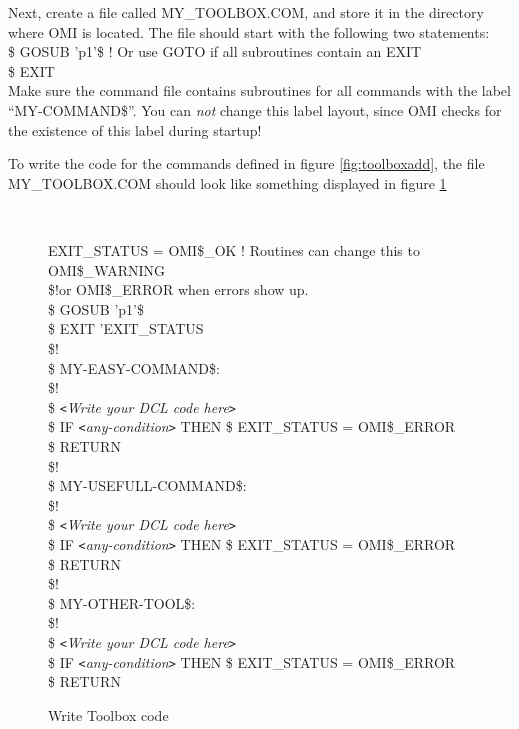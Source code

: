\documentclass[a4paper]{book}
\newcommand{\vs}{\vspace{3mm}}
\newcommand{\lt}{\texttt{<}}
\newcommand{\gt}{\texttt{>}}
\renewcommand{\indent}{\hspace*{5mm}}
\begin{document}
Next, create a file called MY{\_}TOOLBOX.COM, and store it in the directory 
where OMI is located. The file should start with the following two 
statements: \\
\indent\textsf{{\$} GOSUB 'p1'{\$} ! Or use GOTO if all subroutines contain an EXIT} \\
\indent\textsf{{\$} EXIT} \\
Make sure the command file contains subroutines for all commands with the 
label ``MY-COMMAND{\$}''. You can \textit{not} change this label layout, since OMI checks 
for the existence of this label during startup!

\vs

To write the code for the commands defined in figure \ref{fig:toolboxadd}, the file 
\linebreak MY{\_}TOOLBOX.COM should look like something displayed in figure \ref{fig:toolboxcre}

\begin{figure}[ht]
\begin{minipage}[t]{\textwidth}
\hrulefill \\
\begin{ttfamily}
\noindent{\$} EXIT{\_}STATUS = OMI{\$}{\_}OK ! Routines can change this to OMI{\$}{\_}WARNING \\
{\$}!\hspace{3cm}or OMI{\$}{\_}ERROR when errors show up. \\
{\$} GOSUB 'p1'{\$} \\
{\$} EXIT 'EXIT{\_}STATUS \\
{\$}! \\
{\$} MY-EASY-COMMAND{\$}: \\
{\$}! \\
{\$} \textit{\lt Write your DCL code here\gt} \\
{\$} IF \textit{\lt any-condition\gt} THEN {\$} EXIT{\_}STATUS = OMI{\$}{\_}ERROR \\
{\$} RETURN \\
{\$}! \\
{\$} MY-USEFULL-COMMAND{\$}: \\
{\$}! \\
{\$} \textit{\lt Write your DCL code here\gt} \\
{\$} IF \textit{\lt any-condition\gt} THEN {\$} EXIT{\_}STATUS = OMI{\$}{\_}ERROR \\
{\$} RETURN \\
{\$}! \\
{\$} MY-OTHER-TOOL{\$}: \\
{\$}! \\
{\$} \textit{\lt Write your DCL code here\gt} \\
{\$} IF \textit{\lt any-condition\gt} THEN {\$} EXIT{\_}STATUS = OMI{\$}{\_}ERROR \\
{\$} RETURN \\
\end{ttfamily}
\caption{Write Toolbox code}\label{fig:toolboxcre}
\hrulefill
\end{minipage}
\end{figure}
\end{document}
